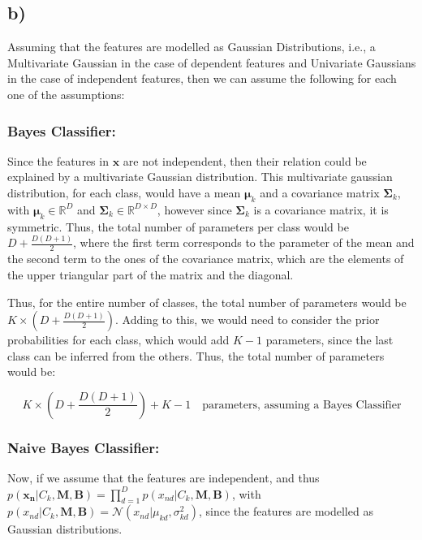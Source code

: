 \documentclass[12pt,a4paper,oneside]{paper}
\begin{document}
\newpage
\subsection*{b)}

Assuming that the features are modelled as Gaussian Distributions, i.e., a Multivariate Gaussian in the case of dependent features and Univariate Gaussians in the case of independent features, then we can assume the following for each
one of the assumptions: 

\subsubsection*{Bayes Classifier:}

Since the features in $\bm{x}$ are not independent, then their relation could be explained by a multivariate Gaussian distribution.
This multivariate gaussian distribution, for each class, would have a mean $\bm{\mu}_k$ and a covariance matrix $\bm{\Sigma}_k$, with
$\bm{\mu}_k \in \mathbb{R}^{D}$ and $\bm{\Sigma}_k \in \mathbb{R}^{D \times D}$, however since $\bm{\Sigma}_k$ is a covariance matrix, it is symmetric.
Thus, the total number of parameters per class would be $D + \frac{D(D+1)}{2}$, where the first term corresponds to the parameter of the mean and the second term to the ones of the covariance matrix, 
which are the elements of the upper triangular part of the matrix and the diagonal.

Thus, for the entire number of classes, the total number of parameters would be $K \times (D + \frac{D(D+1)}{2})$.
Adding to this, we would need to consider the prior probabilities for each class, which would add $K - 1$ parameters, since the last class can be inferred from the others.
Thus, the total number of parameters would be:

$$
K \times (D + \frac{D(D+1)}{2}) + K - 1 \quad \text{parameters, assuming a Bayes Classifier}
$$

\subsubsection*{Naive Bayes Classifier:}

Now, if we assume that the features are independent, and thus $p(\bm{x_n} | C_k, \bm{M}, \bm{B}) = \prod_{d=1}^{D} p(x_{nd} | C_k, \bm{M}, \bm{B})$,
with $p(x_{nd} | C_k, \bm{M}, \bm{B}) = \mathcal{N}(x_{nd} | \mu_{kd}, \sigma_{kd}^2)$, since the features are modelled as Gaussian distributions. 
\end{document}

